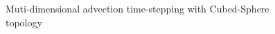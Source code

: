 \begin{figure}
\caption{Muti-dimensional advection time-stepping with Cubed-Sphere topology
\label{fig:advect-multidim_cs}
}
\end{figure}

